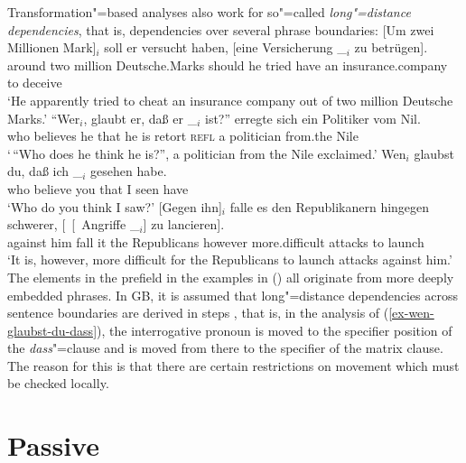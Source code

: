 Transformation"=based analyses also work for so"=called \emph{long"=distance dependencies}, that is, dependencies
over several phrase boundaries:
\eal
\label{bsp-Fernabhaengigkeit}
\ex\label{bsp-um-zwei-millionen}
\gll {}[Um zwei Millionen Mark]$_i$ soll er versucht haben, [eine Versicherung \_$_i$ zu betrügen].\footnotemark\\
     {}\spacebr{}around two million Deutsche.Marks should he tried have \spacebr{}an insurance.company {} to deceive\\
\glt `He apparently tried to cheat an insurance company out of two million Deutsche Marks.'
\ex
\gll "`Wer$_i$, glaubt er, daß er \_$_i$ ist?"' erregte sich ein Politiker vom Nil.\footnotemark\\
     \spacebr{}who believes he that he {} is retort \textsc{refl} a politician from.the Nile\\
\glt `\,``Who does he think he is?'', a politician from the Nile exclaimed.'
\ex\label{ex-wen-glaubst-du-dass}
\gll Wen$_i$ glaubst du, daß ich \_$_i$ gesehen habe.\footnotemark\\
     who believe you that I {} seen have\\
\glt `Who do you think I saw?'
\ex 
\gll {}[Gegen ihn]$_i$ falle es den Republikanern hingegen schwerer, [~[~Angriffe \_$_i$] zu lancieren].\footnotemark\\
	 {}\spacebr{}against him fall it the Republicans however more.difficult \hspaceThis{[~[~}attacks {} to launch\\
\glt `It is, however, more difficult for the Republicans to launch attacks against him.'
\zl
The elements in the prefield in the examples in () all originate from more deeply embedded phrases. In GB,
it is assumed that long"=distance dependencies across sentence boundaries are derived in steps 
\citep[--79]{Grewendorf88a}, that is, in the analysis of (\ref{ex-wen-glaubst-du-dass}), the interrogative
pronoun is moved to the specifier position of the \emph{dass}"=clause and is moved from there to the specifier of
the matrix clause. The reason for this is that there are certain restrictions on movement which must be checked
locally.%

\section{Passive}
\label{Abschnitt-GB-Passiv}\label{sec-passive-gb}

